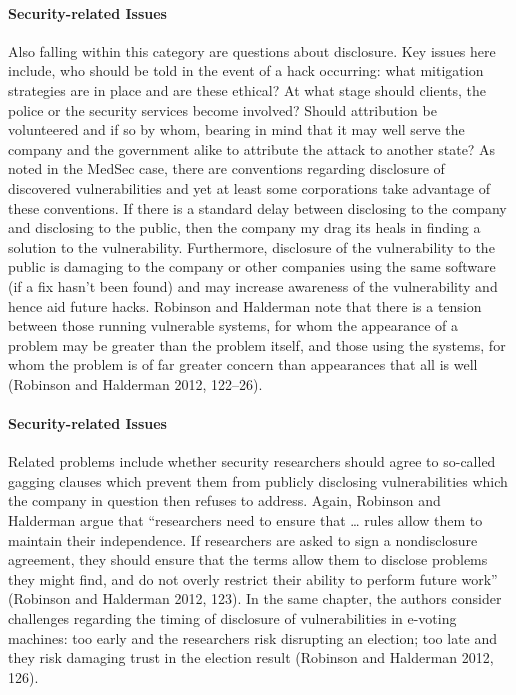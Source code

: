 \documentclass{svjour3}                     %
\begin{document}
\paragraph{Security-related Issues}
Also falling within this category are questions about disclosure. Key issues here include, who should be told in the event of a hack occurring: what mitigation strategies are in place and are these ethical? At what stage should clients, the police or the security services become involved? Should attribution be volunteered and if so by whom, bearing in mind that it may well serve the company and the government alike to attribute the attack to another state? As noted in the MedSec case, there are conventions regarding disclosure of discovered vulnerabilities and yet at least some corporations take advantage of these conventions. If there is a standard delay between disclosing to the company and disclosing to the public, then the company my drag its heals in finding a solution to the vulnerability. Furthermore, disclosure of the vulnerability to the public is damaging to the company or other companies using the same software (if a fix hasn’t been found) and may increase awareness of the vulnerability and hence aid future hacks. Robinson and Halderman note that there is a tension between those running vulnerable systems, for whom the appearance of a problem may be greater than the problem itself, and those using the systems, for whom the problem is of far greater concern than appearances that all is well (Robinson and Halderman 2012, 122–26).  

\paragraph{Security-related Issues}
Related problems include whether security researchers should agree to so-called gagging clauses which prevent them from publicly disclosing vulnerabilities which the company in question then refuses to address. Again, Robinson and Halderman argue that “researchers need to ensure that … rules allow them to maintain their independence. If researchers are asked to sign a nondisclosure agreement, they should ensure that the terms allow them to disclose problems they might find, and do not overly restrict their ability to perform future work” (Robinson and Halderman 2012, 123). In the same chapter, the authors consider challenges regarding the timing of disclosure of vulnerabilities in e-voting machines: too early and the researchers risk disrupting an election; too late and they risk damaging trust in the election result (Robinson and Halderman 2012, 126).
\end{document}
